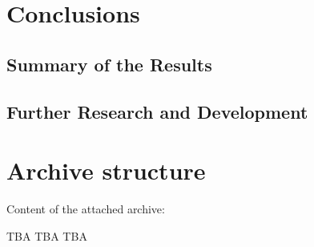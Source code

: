 \documentclass[12pt, twoside]{fithesis2}
\renewcommand{\_}{\leavevmode \kern0.07em\vbox{\hrule width0.4em}}
\begin{document}
\chapter{Conclusions}
\label{chap:conclusions}

\section{Summary of the Results}
\label{sec:conclusions-summary}


\section{Further Research and Development}
\label{sec:conclusions-next}



\appendix

\printbibliography

\chapter{Archive structure}
\label{appendix:archive}

Content of the attached archive:

TBA TBA TBA
\end{document}
